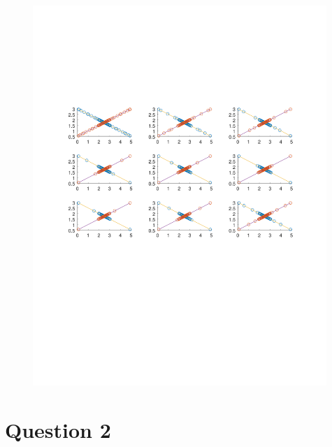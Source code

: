 \documentclass{article}
\begin{document}
\subsection{}

\begin{figure}[h!]
\centering
    \includegraphics[width=0.99\textwidth]{figure3}
\end{figure}

\newpage
\section{Question 2}

\subsection{}


\subsection{}

\end{document}
